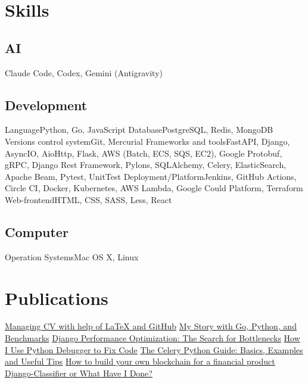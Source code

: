 \documentclass[11pt,a4paper,oneside]{moderncv}
\begin{document}
    \maketitle

    \section{Skills}
        \subsection{AI}
            \cvline
                {}{Claude Code, Codex, Gemini (Antigravity)}
        \subsection{Development}
            \cvline
                {Language}{Python, Go, JavaScript}
            \cvline
                {Database}{PostgreSQL, Redis, MongoDB}
            \cvline
                {Versions control system}{Git, Mercurial}
            \cvline
                {Frameworks and tools}{FastAPI, Django, AsyncIO, AioHttp, Flask, AWS (Batch, ECS, SQS, EC2), Google Protobuf, gRPC, Django Rest Framework, Pylons, SQLAlchemy, Celery, ElasticSearch, Apache Beam, Pytest, UnitTest}
            \cvline
                {Deployment/Platform}{Jenkins, GitHub Actions, Circle CI, Docker, Kubernetes, AWS Lambda, Google Could Platform, Terraform}
            \cvline
                {Web-frontend}{HTML, CSS, SASS, Less, React}

        \subsection{Computer}
            \cvline
                {Operation Systems}{Mac OS X, Linux}

    \section{Publications}
        \cvlistitem
            {\href{https://zakovinko.medium.com/managing-cv-with-help-of-latex-and-github-b51d46727a1d}{Managing CV with help of LaTeX and GitHub}}
        \cvlistitem
            {\href{https://djangostars.com/blog/my-story-with-golang/}{My Story with Go, Python, and Benchmarks}}
        \cvlistitem
            {\href{https://medium.com/free-code-camp/django-performance-optimization-looking-for-the-bottlenecks-8583789e341b}{Django Performance Optimization: The Search for Bottlenecks}}
        \cvlistitem
            {\href{https://codeburst.io/how-i-use-python-debugger-to-fix-code-279f11f75866}{How I Use Python Debugger to Fix Code}}
        \cvlistitem
            {\href{https://codeburst.io/the-celery-python-guide-basics-examples-and-useful-tips-d8da1fcfaea3}{The Celery Python Guide: Basics, Examples and Useful Tips}}
        \cvlistitem
            {\href{https://djangostars.com/blog/how-to-build-your-own-blockchain-for-a-financial-product/}{How to build your own blockchain for a financial product}}
        \cvlistitem
            {\href{https://medium.com/free-code-camp/django-classifier-or-what-have-i-done-4a8164358c09}{Django-Classifier or What Have I Done?}}
\end{document}
